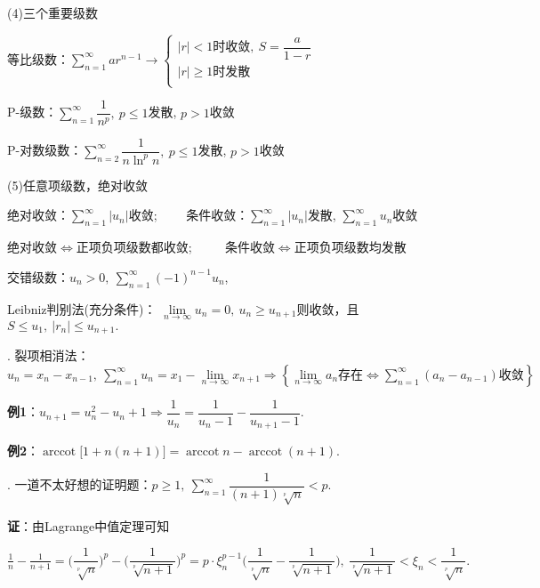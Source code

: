 \documentclass[UTF8]{ctexart}
\numberwithin{equation}{section}
\numberwithin{figure}{section}
\numberwithin{table}{section}
\newcommand\no{\noindent}
\newcommand\dis{\displaystyle}
\newcommand\ls{\leqslant}
\newcommand\gs{\geqslant}
\newcommand\limn{\dis\lim\limits_{n\to\infty}}
\newcommand\sumn{\dis\sum\limits_{n=1}^{\infty}}
\DeclareMathOperator{\arccot}{arccot}
\begin{document}
\begin{spacing}{2}
\no(4)三个重要级数

等比级数：$\sumn ar^{n-1}\longrightarrow\left\{\begin{array}{l}
|r|<1\text{时收敛},\ S=\dfrac{a}{1-r}\\
|r|\gs1\text{时发散}\\
\end{array}\right.$

P-级数：$\sumn \dfrac{1}{n^p},\ p\ls1$发散, $p>1$收敛

\vspace{0.3cm}

P-对数级数：$\dis\sum\limits_{n=2}^{\infty}\dfrac{1}{n\ln^pn},\ p\ls1$发散, $p>1$收敛

\vspace{0.3cm}

\no(5)任意项级数，绝对收敛

绝对收敛：$\sumn|u_n|$收敛; $\qquad$条件收敛：$\sumn|u_n|$发散, $\sumn u_n$收敛

\vspace{0.2cm}

绝对收敛$\Longleftrightarrow$正项负项级数都收敛;
$\qquad$
条件收敛$\Longleftrightarrow$正项负项级数均发散

交错级数：$u_n>0,\ \sumn(-1)^{n-1}u_n$, 

Leibniz判别法(充分条件)：
$\limn u_n=0,\ u_n\gs u_{n+1}$则收敛，且$S\ls u_1,\ |r_n|\ls u_{n+1}.$

\vspace{0.3cm}

\no2. \textcolor[rgb]{1,0,0}{裂项相消法}：$u_n=x_n-x_{n-1},\ \sumn u_n=x_1-\limn x_{n+1}
\Longrightarrow\left\{\limn a_n\text{存在}\Longleftrightarrow\sumn(a_n-a_{n-1})
\text{收敛}\right\}$

\vspace{0.3cm}

\textbf{例1}：$u_{n+1}=u_n^2-u_n+1\Longrightarrow\dfrac{1}{u_n}
=\dfrac{1}{u_n-1}-\dfrac{1}{u_{n+1}-1}.$

\textbf{例2}：$\arccot\big[1+n(n+1)\big]=\arccot n-\arccot (n+1).$

\no3. 一道不太好想的证明题：$p\gs1,\ \sumn\dfrac{1}{(n+1)\sqrt[^p\!]{n}}<p.$

\textbf{证}：由Lagrange中值定理可知

$\dis\frac{1}{n}-\frac{1}{n+1}
=\Bigg(\dfrac{1}{\sqrt[^p\!]{n}}\Bigg)^p-\Bigg(\dfrac{1}{\sqrt[^p\!]{n+1}}\Bigg)^p
=p\cdot\xi_n^{p-1}\Bigg(\dfrac{1}{\sqrt[^p\!]{n}}-\dfrac{1}{\sqrt[^p\!]{n+1}}\Bigg),\ 
\dfrac{1}{\sqrt[^p\!]{n+1}}<\xi_n<\dfrac{1}{\sqrt[^p\!]{n}}.$


\end{spacing}
\end{document}
